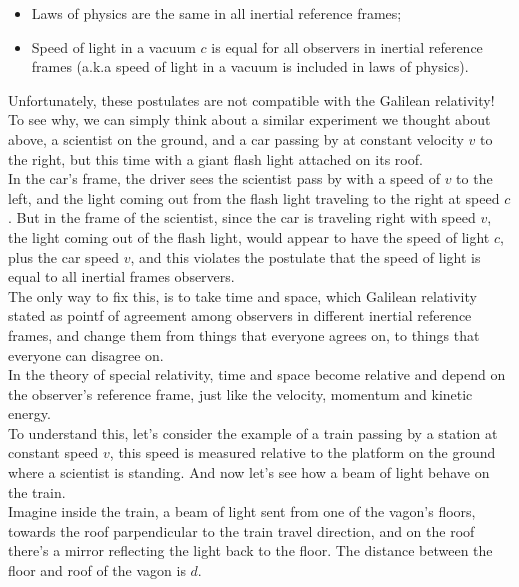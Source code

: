 \begin{itemize}
    \item Laws of physics are the same in all inertial reference frames;
    \item Speed of light in a vacuum $c$ is equal for all observers in inertial reference frames (a.k.a speed of light in a vacuum is included in laws of physics).
\end{itemize}

Unfortunately, these postulates are not compatible with the Galilean relativity!
To see why, we can simply think about a similar experiment we thought about above, a scientist on the ground, and a 
car passing by at constant velocity $v$ to the right, but this time with a giant flash light attached on its roof.\\

In the car's frame, the driver sees the scientist pass by with a speed of $v$ to the left, and the light coming out from the flash light
traveling to the right at speed $c$.
But in the frame of the scientist, since the car is traveling right with speed $v$, the light coming out of the flash light, would appear to have 
the speed of light $c$, plus the car speed $v$, and this violates the postulate that the speed of light is equal to all inertial frames observers.\\

The only way to fix this, is to take time and space, which Galilean relativity stated as pointf of agreement among observers in different inertial reference frames, 
and change them from things that everyone agrees on, to things that everyone can disagree on.\\
In the theory of special relativity, time and space become relative and depend on the observer's reference frame, just like the velocity, momentum and kinetic energy.\\

To understand this, let's consider the example of a train passing by a station at constant speed $v$, this speed is measured relative to the platform
on the ground where a scientist is standing. And now let's see how a beam of light behave on the train.\\

Imagine inside the train, a beam of light sent from one of the vagon's floors, towards the roof parpendicular to the train travel direction, and on the roof there's a mirror reflecting the light back to the floor.
The distance between the floor and roof of the vagon is $d$.

